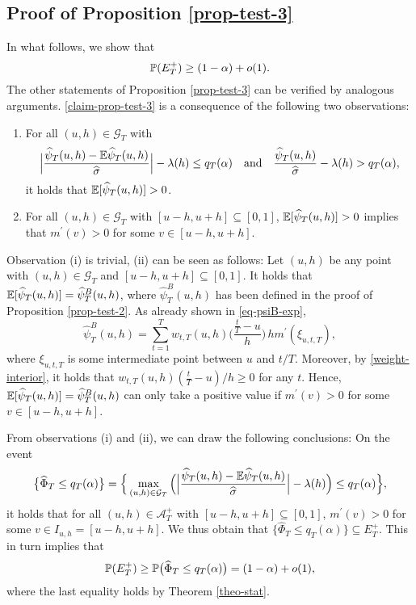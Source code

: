 \subsection*{Proof of Proposition \ref{prop-test-3}}

 
In what follows, we show that 
\begin{equation}\label{claim-prop-test-3}
\mathbb{P}(E_T^+) \ge (1-\alpha) + o(1). 
\end{equation}
The other statements of Proposition \ref{prop-test-3} can be verified by analogous arguments. \eqref{claim-prop-test-3} is a consequence of the following two observations:  
\begin{enumerate}[label=(\roman*),leftmargin=0.75cm]

\item For all $(u,h) \in \mathcal{G}_T$ with   
\[ \Big|\frac{\widehat{\psi}_T(u,h) - \mathbb{E} \widehat{\psi}_T(u,h)}{\widehat{\sigma}}\Big| - \lambda(h) \le q_T(\alpha) \quad \text{and} \quad \frac{\widehat{\psi}_T(u,h)}{\widehat{\sigma}} - \lambda(h) > q_T(\alpha), \]
it holds that $\mathbb{E}[\widehat{\psi}_T(u,h)] > 0$. 

\item For all $(u,h) \in \mathcal{G}_T$ with $[u-h,u+h] \subseteq [0,1]$,  $\mathbb{E}[\widehat{\psi}_T(u,h)] > 0$ implies that $m^\prime(v) > 0$ for some $v \in [u-h,u+h]$. 

\end{enumerate}
Observation (i) is trivial, (ii) can be seen as follows: Let $(u,h)$ be any point with $(u,h) \in \mathcal{G}_T$ and $[u-h,u+h] \subseteq [0,1]$. It holds that $\mathbb{E}[\widehat{\psi}_T(u,h)] = \widehat{\psi}_T^B(u,h)$, where $\widehat{\psi}_T^B(u,h)$ has been defined in the proof of Proposition \ref{prop-test-2}. As already shown in \eqref{eq-psiB-exp},  
\[ \widehat{\psi}_T^B(u,h) = \sum\limits_{t=1}^T w_{t,T}(u,h) \Big( \frac{\frac{t}{T} - u}{h} \Big) \, h m^\prime(\xi_{u,t,T}), \]
where $\xi_{u,t,T}$ is some intermediate point between $u$ and $t/T$. Moreover, by \eqref{weight-interior}, it holds that $w_{t,T}(u,h) (\frac{t}{T} - u)/h \ge 0$ for any $t$. Hence, $\mathbb{E}[\widehat{\psi}_T(u,h)] = \widehat{\psi}_T^B(u,h)$ can only take a positive value if $m^\prime(v) > 0$ for some $v \in [u-h,u+h]$. 


From observations (i) and (ii), we can draw the following conclusions: On the event 
\[ \big\{ \widehat{\Phi}_T \le q_T(\alpha) \big\} = \Big\{ \max_{(u,h) \in \mathcal{G}_T} \Big( \Big|\frac{\widehat{\psi}_T(u,h) - \mathbb{E} \widehat{\psi}_T(u,h)}{\widehat{\sigma}}\Big| - \lambda(h) \Big) \le q_T(\alpha) \Big\}, \]
it holds that for all $(u,h) \in \mathcal{A}_T^+$ with $[u-h,u+h] \subseteq [0,1]$, $m^\prime(v) > 0$ for some $v \in I_{u,h} = [u-h,u+h]$. We thus obtain that $\{ \widehat{\Phi}_T \le q_T(\alpha) \} \subseteq E_T^+$. This in turn implies that 
\[ \mathbb{P}(E_T^+) \ge \mathbb{P} \big(  \widehat{\Phi}_T \le q_T(\alpha) \big) = (1-\alpha) + o(1), \]
where the last equality holds by Theorem \ref{theo-stat}. 



